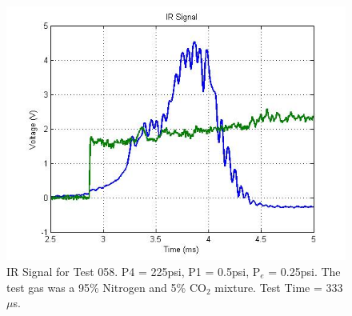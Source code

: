 \begin{figure}
\centering
\includegraphics[width = \textwidth]{Figures/H2andCo2.jpg}
\caption[IR Signal for Test 046]{IR Signal for Test 058. P4 = 225psi, P1 = 0.5psi, P$_e$ = 0.25psi. The test gas was a 95\% Nitrogen and 5\% CO$_2$ mixture. Test Time = 333 $\mu$s.}
\label{fig:IRTrace3}
\end{figure}

